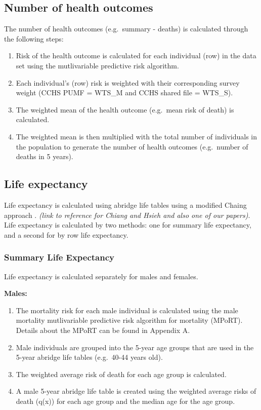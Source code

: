 \documentclass[]{book}
\begin{document}
\subsection{Number of health outcomes}\label{number-of-health-outcomes}

The number of health outcomes (e.g.~summary - deaths) is calculated
through the following steps:

\begin{enumerate}
\def\labelenumi{\arabic{enumi}.}
\item
  Risk of the health outcome is calculated for each individual (row) in
  the data set using the mutlivariable predictive risk algorithm.
\item
  Each individual's (row) risk is weighted with their corresponding
  survey weight (CCHS PUMF = WTS\_M and CCHS shared file = WTS\_S).
\item
  The weighted mean of the health outcome (e.g.~mean risk of death) is
  calculated.
\item
  The weighted mean is then multiplied with the total number of
  individuals in the population to generate the number of health
  outcomes (e.g.~number of deaths in 5 years).
\end{enumerate}

\subsection{Life expectancy}\label{life-expectancy}

Life expectancy is calculated using abridge life tables using a modified
Chaing approach \citep{Chiang} \citep{Hsieh}. \emph{(link to reference
for Chiang and Hsieh and also one of our papers)}. Life expectancy is
calculated by two methods: one for summary life expectancy, and a second
for by row life expectancy.

\subsubsection{Summary Life Expectancy}\label{summary-life-expectancy}

Life expectancy is calculated separately for males and females.

\textbf{Males:}

\begin{enumerate}
\def\labelenumi{\arabic{enumi}.}
\item
  The mortality risk for each male individual is calculated using the
  male mortality mutlivariable predictive risk algorithm for mortality
  (MPoRT). Details about the MPoRT can be found in Appendix A.
\item
  Male individuals are grouped into the 5-year age groups that are used
  in the 5-year abridge life tables (e.g.~40-44 years old).
\item
  The weighted average risk of death for each age group is calculated.
\item
  A male 5-year abridge life table is created using the weighted average
  risks of death (q(x)) for each age group and the median age for the
  age group.
\end{enumerate}
\end{document}
